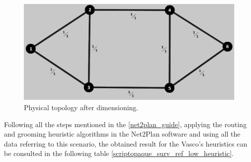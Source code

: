\begin{figure}[H]
\centering
\includegraphics[width=13cm]{sdf/heuristic/opaque_survivability/figures/physical_topology}
\caption{Physical topology after dimensioning.}
\label{physical_topology_surv_ref_low_heuristic}
\end{figure}

Following all the steps mentioned in the \ref{net2plan_guide}, applying the routing and grooming heuristic algorithms in the Net2Plan software and using all the data referring to this scenario, the obtained result for the Vasco's heuristics can be consulted in the following table \ref{scriptopaque_surv_ref_low_heuristic}.\\


